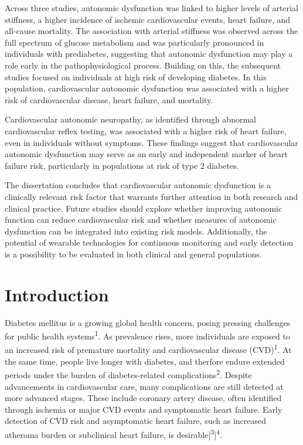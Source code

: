 \documentclass[
  a4paper,
  headsepline=true,
  open=any]{scrbook}
\begin{document}
Across three studies, autonomic dysfunction was linked to higher levels
of arterial stiffness, a higher incidence of ischemic cardiovascular
events, heart failure, and all-cause mortality. The association with
arterial stiffness was observed across the full spectrum of glucose
metabolism and was particularly pronounced in individuals with
prediabetes, suggesting that autonomic dysfunction may play a role early
in the pathophysiological process. Building on this, the subsequent
studies focused on individuals at high risk of developing diabetes. In
this population, cardiovascular autonomic dysfunction was associated
with a higher risk of cardiovascular disease, heart failure, and
mortality.

Cardiovascular autonomic neuropathy, as identified through abnormal
cardiovascular reflex testing, was associated with a higher risk of
heart failure, even in individuals without symptoms. These findings
suggest that cardiovascular autonomic dysfunction may serve as an early
and independent marker of heart failure risk, particularly in
populations at risk of type 2 diabetes.

The dissertation concludes that cardiovascular autonomic dysfunction is
a clinically relevant risk factor that warrants further attention in
both research and clinical practice. Future studies should explore
whether improving autonomic function can reduce cardiovascular risk and
whether measures of autonomic dysfunction can be integrated into
existing risk models. Additionally, the potential of wearable
technologies for continuous monitoring and early detection is a
possibility to be evaluated in both clinical and general populations.


\hypertarget{introduction}{%
\chapter{Introduction}\label{introduction}}

Diabetes mellitus is a growing global health concern, posing pressing
challenges for public health systems\textsuperscript{1}. As prevalence
rises, more individuals are exposed to an increased risk of premature
mortality and cardiovascular disease (CVD)\textsuperscript{1}. At the
same time, people live longer with diabetes, and therfore endure
extended periods under the burden of diabetes-related
complications\textsuperscript{2}. Despite advancements in cardiovascular
care, many complications are still detected at more advanced stages.
These include coronary artery disease, often identified through ischemia
or major CVD events and symptomatic heart failure. Early detection of
CVD risk and asymptomatic heart failure, such as increased atheroma
burden or subclinical heart failure, is
desirable{[}\textsuperscript{3}{]}\textsuperscript{4}.
\end{document}
